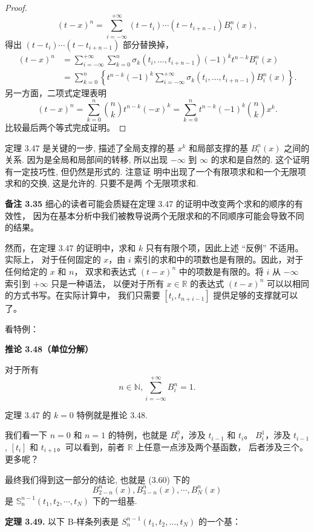 \documentclass[a4paper]{ctexart}
\begin{document}
{\begin{proof}
\[
(t-x)^n = \sum_{i=-\infty}^{+\infty} (t-t_i) \cdots(t-t_{i+n-1}) B_i^n(x),
\]
  得出 $(t-t_i) \cdots(t-t_{i+n-1})$ 部分替换掉，
  \begin{align*}
  (t - x)^n &= \sum_{i=-\infty}^{+\infty} \sum_{k=0}^n \sigma_k(t_i, \ldots, t_{i+n-1})(-1)^k t^{n-k} B_i^n(x) \\
  &= \sum_{k=0}^n \left\{ t^{n-k} (-1)^k \sum_{i=-\infty}^{+\infty} \sigma_k(t_i, \ldots, t_{i+n-1}) B_i^n(x) \right\}.
  \end{align*}
  另一方面，二项式定理表明
  \[
  (t - x)^n = \sum_{k=0}^n \binom{n}{k} t^{n-k} (-x)^k = \sum_{k=0}^n t^{n-k} (-1)^k \binom{n}{k} x^k.
  \]
  比较最后两个等式完成证明。
\end{proof}

定理 3.47 是关键的一步, 描述了全局支撑的基 $x^k$ 和局部支撑的基
$B_i^n(x)$ 之间的关系. 因为是全局和局部间的转移, 所以出现 $-\infty$ 到
$\infty$ 的求和是自然的. 这个证明有一定技巧性, 但仍然是形式的. 注意证
明中出现了一个有限项求和和一个无限项求和的交换, 这是允许的. 只要不是两
个无限项求和.

\noindent \textbf{备注 3.35} 细心的读者可能会质疑在定理 3.47 的证明中改变两个求和的顺序的有效性，
因为在基本分析中我们被教导说两个无限求和的不同顺序可能会导致不同的结果。

然而，在定理 3.47 的证明中，求和 $k$ 只有有限个项，因此上述 ``反例'' 不适用。实际上，
对于任何固定的 $x$，由 $i$ 索引的求和中的项数也是有限的。因此，对于任何给定的 $x$ 和 $n$，
双求和表达式 $(t - x)^n$ 中的项数是有限的。将 $i$ 从 $-\infty$ 索引到 $+\infty$ 只是一种语法，
以便对于所有 $x \in \mathbb{R}$ 的表达式 $(t - x)^n$ 可以以相同的方式书写。在实际计算中，
我们只需要 $[t_i, t_{n + i - 1}]$ 提供足够的支撑就可以了。

看特例：

\noindent \textbf{推论 3.48（单位分解）}

对于所有 
\[
n \in \mathbb{N}, \sum_{i=-\infty}^{+\infty} B_i^n = 1. \tag{3.59}
\]

定理 3.47 的 $k = 0$ 特例就是推论 3.48.

我们看一下 $n = 0$ 和 $n = 1$ 的特例，也就是 $B_i^0$，涉及 $t_{i - 1}$ 和 $t_i$。
$B_i^1$，涉及 $t_{i - 1}$, $[t_i]$ 和 $t_{i + 1}$。可以看到，前者 $\mathbb{R}$ 上任意一点涉及两个基函数，
后者涉及三个。更多呢？

最终我们得到这一部分的结论, 也就是 (3.60) 下的
$$
B_{2 - n}^n(x), B_{3 - n}^n(x), \cdots, B_{N}^n(x)
$$
是 $\mathbb{S}_n^{n - 1}(t_1, t_2, \cdots, t_N)$ 下的一组基.

\noindent \textbf{定理 3.49.} 以下 B-样条列表是 $S_{n}^{n-1}\left(t_{1}, t_{2},\ldots, t_{N}\right)$ 的一个基：

}
\end{document}
